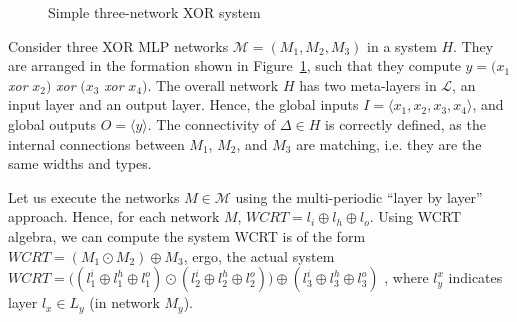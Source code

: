 
\begin{figure}[H]
	\centering
	\scalebox{0.8}{}
	\caption{Simple three-network XOR system}
	\label{fig:three-xor}
\end{figure}

\begin{example}
	\label{ex:simple-xor}
	Consider three XOR \ac{MLP} networks $\mathcal{M} = \left(M_1, M_2, M_3\right)$ in a system $H$.
	They are arranged in the formation shown in Figure~\ref{fig:three-xor}, such that they compute $y = \big(x_1$ \textit{xor} $x_2\big)$ \textit{xor} $\big(x_3$ \textit{xor} $x_4\big)$.
	The overall network $H$ has two meta-layers in $\mathcal{L}$, an input layer and an output layer. 
	Hence, the global inputs $I = \langle x_1, x_2, x_3, x_4 \rangle$, and global outputs $O = \langle y \rangle$.
	The connectivity of $\Delta \in H$ is correctly defined, as the internal connections between $M_1$, $M_2$, and $M_3$ are matching, i.e. they are the same widths and types. 
	
	Let us execute the networks $M \in \mathcal{M}$ using the multi-periodic ``layer by layer'' approach. 
	Hence, for each network $M$, $WCRT = l_i \oplus l_h \oplus l_o$.
	Using \ac{WCRT} algebra, we can compute the system WCRT is of the form $WCRT = \left(M_1 \odot M_2\right) \oplus M_3$, ergo, the actual system \\ $WCRT = \Big(\left(l_1^i \oplus l_1^h \oplus l_1^o\right) \odot \left(l_2^i \oplus l_2^h \oplus l_2^o\right)\Big) \oplus \left(l_3^i \oplus l_3^h \oplus l_3^o\right)$ , where $l^x_y$ indicates layer $l_x \in L_y$ (in network $M_y$).
\end{example}

